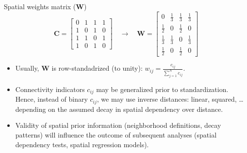 \documentclass{beamer}
\begin{document}
\begin{frame}{Spatial weights matrix ($\bm{W}$)}
\vspace{-0.5cm}
$$
\bm{C} = \begin{bmatrix}
0 & 1 & 1 & 1 \\
1 & 0 & 1 & 0 \\
1 & 1 & 0 & 1 \\
1 & 0 & 1 & 0
\end{bmatrix} \quad \rightarrow \quad
\bm{W}=
\begin{bmatrix}
0 & \tfrac{1}{3} & \tfrac{1}{3} & \tfrac{1}{3} \\[2pt]
\tfrac{1}{2} & 0 & \tfrac{1}{2} & 0 \\[2pt]
\tfrac{1}{3} & \tfrac{1}{3} & 0 & \tfrac{1}{3} \\[2pt]
\tfrac{1}{2} & 0 & \tfrac{1}{2} & 0
\end{bmatrix}
$$
\begin{itemize}
	\item Usually, $\bm{W}$ is row-standadrized (to unity): 
	$w_{ij} = \frac{c_{ij}}{\sum^N_{j=1} c_{ij}}$.
	\medskip
	\item Connectivity indicators $c_{ij}$ may be generalized prior to standardization. Hence, instead of binary $c_{ij}$, we may use inverse distances: linear, squared, \dots depending on the assumed decay in spatial dependency over distance.
	\medskip 
	\item Validity of spatial prior information (neighborhood definitions, decay patterns) will influence the outcome of subsequent analyses (spatial dependency tests, spatial regression models).
\end{itemize}
\end{frame}
\end{document}
